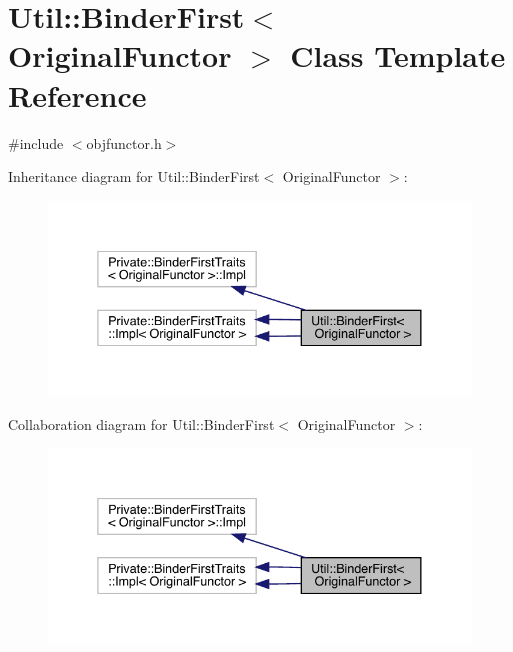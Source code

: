 \hypertarget{classUtil_1_1BinderFirst}{}\section{Util\+:\+:Binder\+First$<$ Original\+Functor $>$ Class Template Reference}
\label{classUtil_1_1BinderFirst}


{\ttfamily \#include $<$objfunctor.\+h$>$}



Inheritance diagram for Util\+:\+:Binder\+First$<$ Original\+Functor $>$\+:
\nopagebreak
\begin{figure}[H]
\begin{center}
\leavevmode
\includegraphics[width=338pt]{d0/d64/classUtil_1_1BinderFirst__inherit__graph}
\end{center}
\end{figure}


Collaboration diagram for Util\+:\+:Binder\+First$<$ Original\+Functor $>$\+:
\nopagebreak
\begin{figure}[H]
\begin{center}
\leavevmode
\includegraphics[width=338pt]{dc/d5d/classUtil_1_1BinderFirst__coll__graph}
\end{center}
\end{figure}
